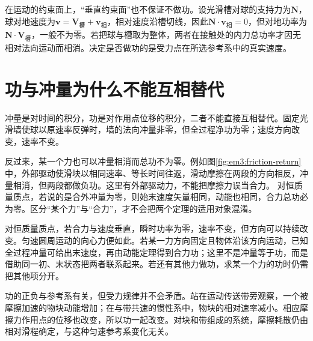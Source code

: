 在运动的约束面上，“垂直约束面”也不保证不做功。设光滑槽对球的支持力为$\bm N$，球对地速度为$\bm v=\bm V_{\text{槽}}+\bm v_{\text{相}}$，相对速度沿槽切线，因此$\bm N\cdot\bm v_{\text{相}}=0$，但对地功率为$\bm N\cdot\bm V_{\text{槽}}$，一般不为零。若把球与槽取为整体，两者在接触处的内力总功率才因无相对法向运动而相消。决定是否做功的是受力点在所选参考系中的真实速度。

\section{功与冲量为什么不能互相替代}

冲量是对时间的积分，功是对作用点位移的积分，二者不能直接互相替代。固定光滑墙使球以原速率反弹时，墙的法向冲量非零，但全过程净功为零；速度方向改变，速率不变。

反过来，某一个力也可以冲量相消而总功不为零。例如图\ref{fig:em3:friction-return}中，外部驱动使滑块以相同速率、等长时间往返，滑动摩擦在两段的方向相反，冲量相消，但两段都做负功。这里有外部驱动力，不能把摩擦力误当合力。
对恒质量质点，若说的是合外冲量为零，则始末速度矢量相同，动能也相同，合力总功必为零。区分“某个力”与“合力”，才不会把两个定理的适用对象混淆。


对恒质量质点，若合力与速度垂直，瞬时功率为零，速率不变，但方向可以持续改变。匀速圆周运动的向心力便如此。若某一力方向固定且物体沿该方向运动，已知全过程冲量可给出末速度，再由动能定理得到合力功；这里不是冲量等于功，而是借助同一初、末状态把两者联系起来。若还有其他力做功，求某一个力的功时仍需把其他项分开。

功的正负与参考系有关，但受力规律并不会矛盾。站在运动传送带旁观察，一个被摩擦加速的物块动能增加；在与带共速的惯性系中，物块的相对速率减小。相应摩擦力作用点的位移也改变，所以功一起改变。对块和带组成的系统，摩擦耗散仍由相对滑程确定，与这种匀速参考系变化无关。

